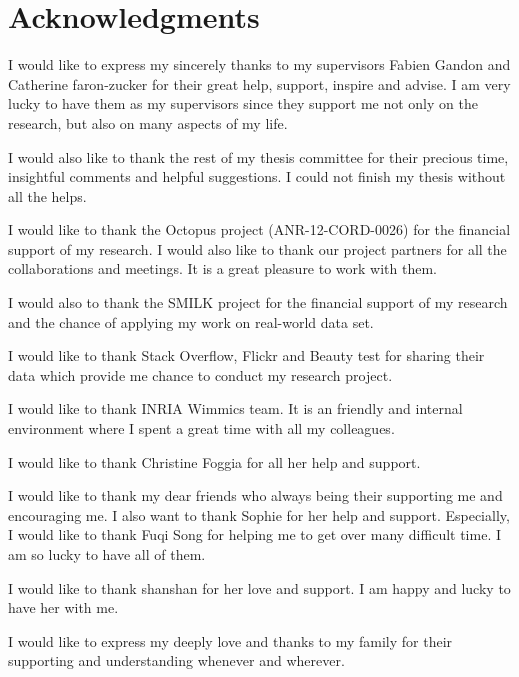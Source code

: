 \documentclass[a4paper,11pt,twoside]{ThesisStyle}
\begin{document}


\doublespacing
\dominitoc


 \cleardoublepage

\section*{Acknowledgments}

I would like to express my sincerely thanks to my supervisors Fabien Gandon and Catherine faron-zucker for their great help, support, inspire and advise. I am very lucky to have them as my supervisors since they support me not only on the research, but also on many aspects of my life. 

I would also like to thank the rest of my thesis committee for their precious time, insightful comments and helpful suggestions. I could not finish my thesis without all the helps.

I would like to thank the Octopus project (ANR-12-CORD-0026) for the financial support of my research. I would also like to thank our project partners for all the collaborations and meetings. It is a great pleasure to work with them.

I would also to thank the SMILK project for the financial support of my research and the chance of applying my work on real-world data set.

I would like to thank Stack Overflow, Flickr and Beauty test for sharing their data which provide me chance to conduct my research project.

I would like to thank INRIA Wimmics team. It is an friendly and internal environment where I spent a great time with all my colleagues.

I would like to thank Christine Foggia for all her help and support.

I would like to thank my dear friends who always being their supporting me and encouraging me. I also want to thank Sophie for her help and support. Especially, I would like to thank Fuqi Song for helping me to get over many difficult time. I am so lucky to have all of them.

I would like to thank shanshan for her love and support. I am happy and lucky to have her with me.

I would like to express my deeply love and thanks to my family for their supporting and understanding whenever and wherever.  
\end{document}
